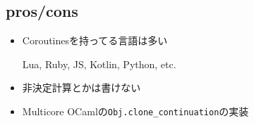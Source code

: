 \subsection*{pros/cons}
\begin{frame}[fragile]
  \frametitlesubs

  \pause
  \begin{itemize}
    \item<+->[\coloremoji{😁}] 

      Coroutinesを持ってる言語は多い

      {\small Lua, Ruby, JS, Kotlin, Python, etc.}

    \item<+->[\coloremoji{😅}] 

      非決定計算とかは書けない

    \item<+->[\coloremoji{🤔}] 

      \alert{Multicore OCaml}の\lstinline{Obj.clone_continuation}の実装
  \end{itemize}
\end{frame}
